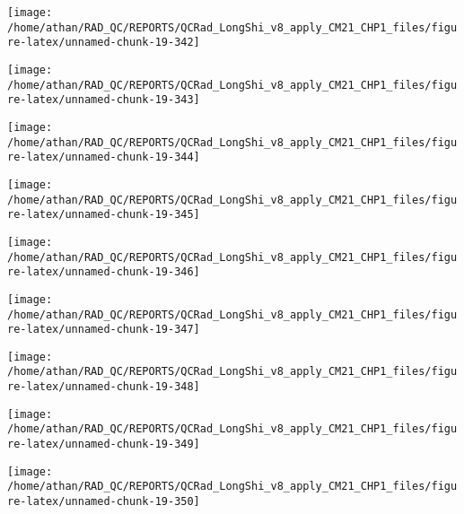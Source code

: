 \documentclass[
  10pt,
  a4paper,oneside]{article}
\begin{document}
\begin{center}\texttt{[image: /home/athan/RAD\_QC/REPORTS/QCRad\_LongShi\_v8\_apply\_CM21\_CHP1\_files/figure-latex/unnamed-chunk-19-342]} \end{center}

\begin{center}\texttt{[image: /home/athan/RAD\_QC/REPORTS/QCRad\_LongShi\_v8\_apply\_CM21\_CHP1\_files/figure-latex/unnamed-chunk-19-343]} \end{center}

\begin{center}\texttt{[image: /home/athan/RAD\_QC/REPORTS/QCRad\_LongShi\_v8\_apply\_CM21\_CHP1\_files/figure-latex/unnamed-chunk-19-344]} \end{center}

\begin{center}\texttt{[image: /home/athan/RAD\_QC/REPORTS/QCRad\_LongShi\_v8\_apply\_CM21\_CHP1\_files/figure-latex/unnamed-chunk-19-345]} \end{center}

\begin{center}\texttt{[image: /home/athan/RAD\_QC/REPORTS/QCRad\_LongShi\_v8\_apply\_CM21\_CHP1\_files/figure-latex/unnamed-chunk-19-346]} \end{center}

\begin{center}\texttt{[image: /home/athan/RAD\_QC/REPORTS/QCRad\_LongShi\_v8\_apply\_CM21\_CHP1\_files/figure-latex/unnamed-chunk-19-347]} \end{center}

\begin{center}\texttt{[image: /home/athan/RAD\_QC/REPORTS/QCRad\_LongShi\_v8\_apply\_CM21\_CHP1\_files/figure-latex/unnamed-chunk-19-348]} \end{center}

\begin{center}\texttt{[image: /home/athan/RAD\_QC/REPORTS/QCRad\_LongShi\_v8\_apply\_CM21\_CHP1\_files/figure-latex/unnamed-chunk-19-349]} \end{center}

\begin{center}\texttt{[image: /home/athan/RAD\_QC/REPORTS/QCRad\_LongShi\_v8\_apply\_CM21\_CHP1\_files/figure-latex/unnamed-chunk-19-350]} \end{center}
\end{document}
